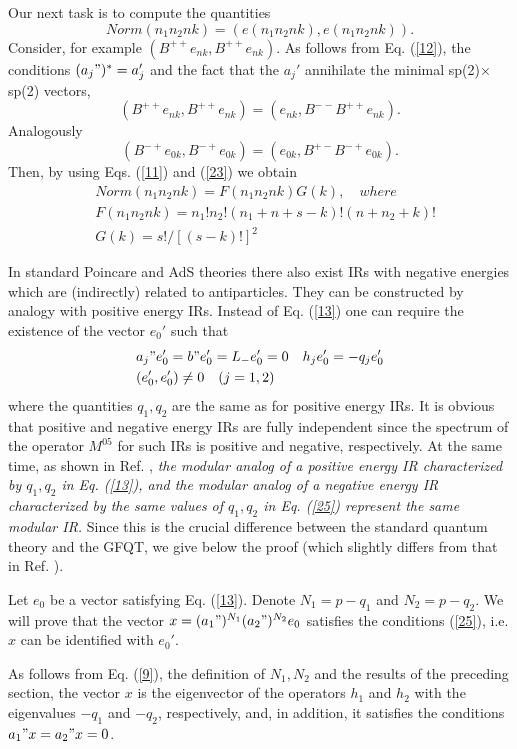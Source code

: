 \documentclass[a4paper,12pt]{article}%
\begin{document}
Our next task is to compute the quantities 
$$Norm(n_1n_2nk)=(e(n_1n_2nk),e(n_1n_2nk)).$$
Consider, for example $(B^{++}e_{nk},B^{++}e_{nk})$.
As follows from Eq. (\ref{12}), the conditions $(a_j")^*=a_j'$
and the fact that the $a_j'$ annihilate the minimal 
sp(2)$\times$sp(2) vectors, 
$$(B^{++}e_{nk},B^{++}e_{nk})=(e_{nk},B^{--}B^{++}e_{nk}).$$
Analogously
$$(B^{-+}e_{0k},B^{-+}e_{0k})=(e_{0k},B^{+-}B^{-+}e_{0k}).$$
Then, by using Eqs. (\ref{11}) and (\ref{23}) we obtain
\begin{eqnarray}
&Norm(n_1n_2nk)=F(n_1n_2nk)G(k), \quad where \nonumber\\
&F(n_1n_2nk)=n_1!n_2!(n_1+n+s-k)!(n+n_2+k)!\nonumber\\
&G(k)=s!/[(s-k)!]^2
\label{24}
\end{eqnarray}

In standard Poincare and AdS theories there also exist IRs with
negative energies which are (indirectly) related to antiparticles.
They can be constructed by analogy with positive energy IRs.
Instead of Eq. (\ref{13}) one can require the existence of the
vector $e_0'$ such that
\begin{eqnarray}
&a_j"e_0'=b"e_0'=L_-e_0'=0\quad h_je_0'=-q_je_0'\nonumber\\
&(e_0',e_0')\neq 0\quad (j=1,2)
\label{25}
\end{eqnarray}
where the quantities $q_1,q_2$ are the same as for positive
energy IRs. It is obvious that positive and negative energy
IRs are fully independent since the spectrum of the operator
$M^{05}$ for such IRs is positive and negative, respectively.
At the same time, as shown in Ref. \cite{lev2},
{\it the modular analog of a positive energy IR 
characterized by $q_1,q_2$ in Eq. (\ref{13}), and the modular 
analog of a negative energy IR characterized by the same 
values of $q_1,q_2$ in Eq. (\ref{25}) represent the same
modular IR.} Since this is the crucial difference between the
standard quantum theory and the GFQT, we give below the
proof (which slightly differs from that in Ref. \cite{lev2}).

Let $e_0$ be a vector satisfying Eq. (\ref{13}). Denote 
$N_1=p-q_1$ and $N_2=p-q_2$. We will prove that the vector 
$x=(a_1")^{N_1}(a_2")^{N_2}e_0$ satisfies the conditions
(\ref{25}), i.e. $x$ can be identified with $e_0'$. 

As follows from Eq. (\ref{9}), the definition of $N_1,N_2$
and the results of the preceding section, the vector $x$
is the eigenvector of the operators $h_1$ and $h_2$ with
the eigenvalues $-q_1$ and $-q_2$, respectively, and, in
addition, it satisfies the conditions $a_1"x=a_2"x=0$.
\end{document}
